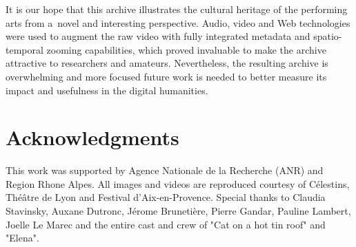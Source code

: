 \documentclass[conference]{IEEEtran}
\newcommand{\todo}[1]{\noindent\textcolor{red}{{\bf \{ToDo} #1{\bf \}}}}
\begin{document}
It is our hope that this archive illustrates the cultural heritage of the performing arts from a~novel and 
interesting perspective. Audio, video and Web technologies were used to augment
the raw video with fully integrated metadata and spatio-temporal zooming capabilities,
which proved invaluable to make the archive attractive to researchers and amateurs.
Nevertheless, the resulting archive is overwhelming and more focused future work is needed to 
better measure its impact and usefulness in the digital humanities. 





\section*{Acknowledgments}

This work was supported by Agence Nationale de la Recherche (ANR) and Region Rhone Alpes. All images and videos are reproduced courtesy of C\'elestins, Th\'e\^atre de Lyon and Festival d'Aix-en-Provence.  Special thanks to Claudia Stavinsky, 
Auxane Dutronc, J\'erome Bruneti\`ere, Pierre Gandar, Pauline Lambert, Joelle Le Marec  and the entire cast and crew 
of "Cat on a hot tin roof" and "Elena". 










\end{document}
